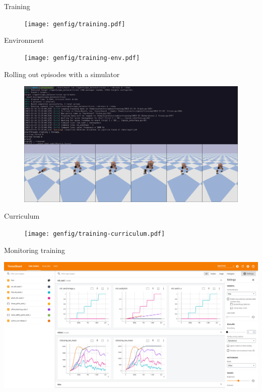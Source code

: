 \documentclass[10pt, aspectratio=1610]{beamer}
\begin{document}
\begin{frame}{Training}
    \begin{figure}
        \texttt{[image: genfig/training.pdf]}
    \end{figure}
\end{frame}

\begin{frame}{Environment}
    \begin{figure}
        \texttt{[image: genfig/training-env.pdf]}
    \end{figure}
\end{frame}

\begin{frame}{Rolling out episodes with a simulator}
    \begin{figure}
        \includegraphics[width=\columnwidth]{figures/upkie-training.png}
    \end{figure}
\end{frame}

\begin{frame}{Curriculum}
    \begin{figure}
        \texttt{[image: genfig/training-curriculum.pdf]}
    \end{figure}
\end{frame}

\begin{frame}{Monitoring training}
   \begin{adjustbox}{width=\paperwidth, height=\paperheight, keepaspectratio, center}
       \includegraphics{figures/tensorboard.png}
   \end{adjustbox}
\end{frame}
\end{document}

